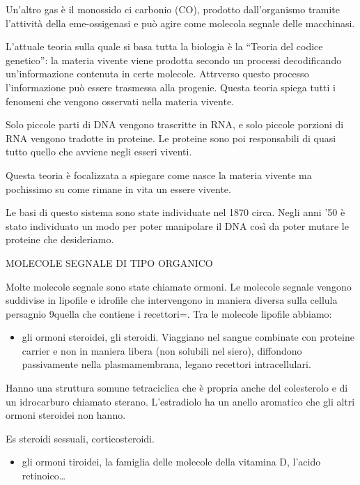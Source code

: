 \documentclass[]{article}
\begin{document}
Un'altro gas è il monossido ci carbonio (CO), prodotto dall'organismo
tramite l'attività della eme-ossigenasi e può agire come molecola
segnale delle macchinasi.

L'attuale teoria sulla quale si basa tutta la biologia è la ``Teoria del
codice genetico'': la materia vivente viene prodotta secondo un processi
decodificando un'informazione contenuta in certe molecole. Attrverso
questo processo l'informazione può essere trasmessa alla progenie.
Questa teoria spiega tutti i fenomeni che vengono osservati nella
materia vivente.

Solo piccole parti di DNA vengono trascritte in RNA, e solo piccole
porzioni di RNA vengono tradotte in proteine. Le proteine sono poi
responsabili di quasi tutto quello che avviene negli esseri viventi.

Questa teoria è focalizzata a spiegare come nasce la materia vivente ma
pochissimo su come rimane in vita un essere vivente.

Le basi di questo sistema sono state individuate nel 1870 circa. Negli
anni '50 è stato individuato un modo per poter manipolare il DNA così da
poter mutare le proteine che desideriamo.

MOLECOLE SEGNALE DI TIPO ORGANICO

Molte molecole segnale sono state chiamate ormoni. Le molecole segnale
vengono suddivise in lipofile e idrofile che intervengono in maniera
diversa sulla cellula persagnio 9quella che contiene i recettori=. Tra
le molecole lipofile abbiamo:

\begin{itemize}
\itemsep1pt\parskip0pt
\item
  gli ormoni steroidei, gli steroidi. Viaggiano nel sangue combinate con
  proteine carrier e non in maniera libera (non solubili nel siero),
  diffondono passivamente nella plasmamembrana, legano recettori
  intracellulari.
\end{itemize}

Hanno una struttura somune tetraciclica che è propria anche del
colesterolo e di un idrocarburo chiamato sterano. L'estradiolo ha un
anello aromatico che gli altri ormoni steroidei non hanno.

Es steroidi sessuali, corticosteroidi.

\begin{itemize}
\itemsep1pt\parskip0pt
\item
  gli ormoni tiroidei, la famiglia delle molecole della vitamina D,
  l'acido retinoico\ldots{}
\end{itemize}
\end{document}
